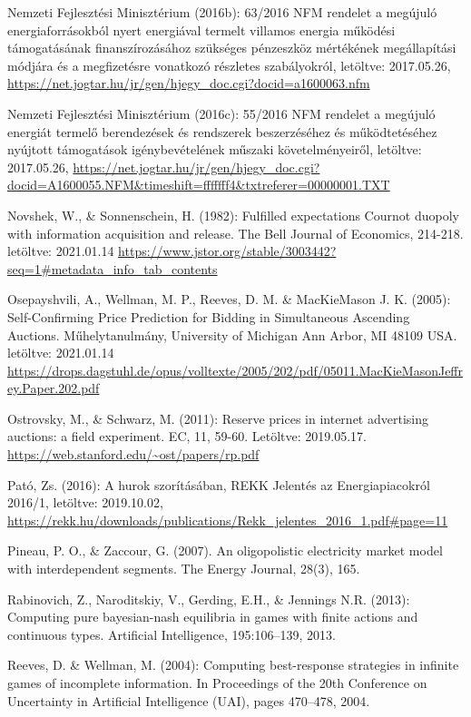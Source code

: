 \documentclass[twoside, magyar, showtrims]{corvinusphd}
\theoremstyle{plain}
\theoremstyle{remark}
\theoremstyle{definition}
\begin{document}
\begin{thebibliography}{99}
Nemzeti Fejlesztési Minisztérium (2016b): 63/2016 NFM rendelet a megújuló energiaforrásokból nyert energiával termelt villamos energia működési támogatásának finanszírozásához szükséges pénzeszköz mértékének megállapítási módjára és a megfizetésre vonatkozó részletes szabályokról, letöltve: 2017.05.26,
\url{https://net.jogtar.hu/jr/gen/hjegy\_doc.cgi?docid=a1600063.nfm}

Nemzeti Fejlesztési Minisztérium (2016c): 55/2016 NFM rendelet a megújuló energiát termelő berendezések és rendszerek beszerzéséhez és működtetéséhez nyújtott támogatások igénybevételének műszaki követelményeiről, letöltve: 2017.05.26,
\url{https://net.jogtar.hu/jr/gen/hjegy\_doc.cgi?docid=A1600055.NFM\&timeshift=fffffff4\&txtreferer=00000001.TXT}

Novshek, W., \& Sonnenschein, H. (1982): Fulfilled expectations Cournot duopoly with information acquisition and release. The Bell Journal of Economics, 214-218. letöltve: 2021.01.14
\url{https://www.jstor.org/stable/3003442?seq=1\#metadata\_info\_tab\_contents}

Osepayshvili, A., Wellman, M. P., Reeves, D. M. \&  MacKieMason J. K. (2005):  Self-Confirming Price Prediction for Bidding in Simultaneous Ascending Auctions. Műhelytanulmány, University of Michigan Ann Arbor, MI 48109 USA. letöltve: 2021.01.14
\url{https://drops.dagstuhl.de/opus/volltexte/2005/202/pdf/05011.MacKieMasonJeffrey.Paper.202.pdf}

Ostrovsky, M., \& Schwarz, M. (2011): Reserve prices in internet advertising auctions: a field experiment. EC, 11, 59-60. Letöltve: 2019.05.17.
\url{https://web.stanford.edu/~ost/papers/rp.pdf}

Pató, Zs. (2016): A hurok szorításában, REKK Jelentés az Energiapiacokról 2016/1, letöltve: 2019.10.02,
\url{https://rekk.hu/downloads/publications/Rekk\_jelentes\_2016\_1.pdf\#page=11}

Pineau, P. O., \& Zaccour, G. (2007). An oligopolistic electricity market model with interdependent segments. The Energy Journal, 28(3), 165.

Rabinovich, Z., Naroditskiy, V., Gerding, E.H., \& Jennings N.R. (2013): Computing pure bayesian-nash equilibria in games with finite actions and continuous types. Artificial Intelligence, 195:106–139, 2013.

Reeves, D. \& Wellman, M. (2004): Computing best-response strategies in infinite games of incomplete information. In Proceedings of the 20th Conference on Uncertainty in Artificial Intelligence
(UAI), pages 470–478, 2004.


\end{thebibliography}
\end{document}
